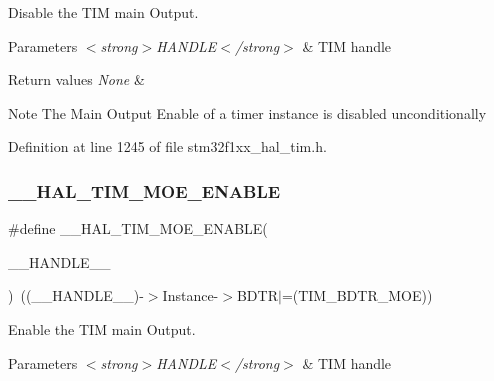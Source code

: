 Disable the T\+IM main Output. 


\begin{DoxyParams}{Parameters}
{\em $<$strong$>$\+H\+A\+N\+D\+L\+E$<$/strong$>$} & T\+IM handle \\
\hline
\end{DoxyParams}

\begin{DoxyRetVals}{Return values}
{\em None} & \\
\hline
\end{DoxyRetVals}
\begin{DoxyNote}{Note}
The Main Output Enable of a timer instance is disabled unconditionally 
\end{DoxyNote}


Definition at line 1245 of file stm32f1xx\+\_\+hal\+\_\+tim.\+h.

\mbox{\label{group___t_i_m___exported___macros_ga04890dcef3ed061854721a3672585607}} 
\subsubsection{\texorpdfstring{\+\_\+\+\_\+\+H\+A\+L\+\_\+\+T\+I\+M\+\_\+\+M\+O\+E\+\_\+\+E\+N\+A\+B\+LE}{\_\_HAL\_TIM\_MOE\_ENABLE}}
{\footnotesize\ttfamily \#define \+\_\+\+\_\+\+H\+A\+L\+\_\+\+T\+I\+M\+\_\+\+M\+O\+E\+\_\+\+E\+N\+A\+B\+LE(\begin{DoxyParamCaption}\item[{}]{\+\_\+\+\_\+\+H\+A\+N\+D\+L\+E\+\_\+\+\_\+ }\end{DoxyParamCaption})~((\+\_\+\+\_\+\+H\+A\+N\+D\+L\+E\+\_\+\+\_\+)-\/$>$Instance-\/$>$B\+D\+TR$\vert$=(T\+I\+M\+\_\+\+B\+D\+T\+R\+\_\+\+M\+OE))}



Enable the T\+IM main Output. 


\begin{DoxyParams}{Parameters}
{\em $<$strong$>$\+H\+A\+N\+D\+L\+E$<$/strong$>$} & T\+IM handle \\
\hline
\end{DoxyParams}

